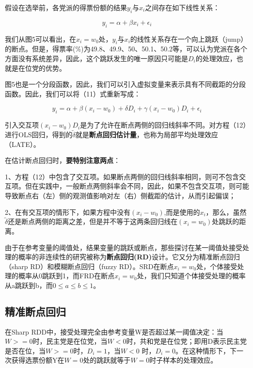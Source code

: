 \documentclass[cn,12pt,math=newtx,citestyle=gb7714-2015,bibstyle=gb7714-2015]{elegantbook}
\begin{document}
	假设在选举前，各党派的得票份额的结果$y_i$与$x_i$之间存在如下线性关系：
	
	\begin{equation}
		y_i=\alpha+\beta{x_i}+\epsilon_i
	\end{equation}
	
	我们从图5可以看出，在$x_i=w_0$处，$y_i$与$x_i$的线性关系存在一个向上跳跃（jump）的断点。但是，得票率(\%)为49.8、49.9、50、50.1、50.2等，可以认为党派在各个方面没有系统差异，因此，这个跳跃发生的唯一原因只可能是$D_i$的处理效应，也就是在位党的优势。
	
	图5也是一个分段函数，因此，我们可以引入虚拟变量来表示具有不同截距的分段函数。因此，我们可以将（11）式重新写成：
	
	\begin{equation}
		y_i=\alpha+\beta{(x_i-w_0)}+\delta{D_i}+\gamma{(x_i-w_0)D_i}+\epsilon_i
	\end{equation}
	
	引入交互项$(x_i-w_0)D_i$是为了允许在断点两侧的回归线斜率不同。对方程（12）进行OLS回归，得到的$\tilde{\delta}$就是\textbf{断点回归估计量}，也称为局部平均处理效应（LATE）。
	
	在估计断点回归时，\textbf{要特别注意两点}：
	
	1、方程（12）中包含了交互项。如果断点两侧的回归线斜率相同，则可不包含交互项。但在实践中，一般断点两侧斜率会不同，因此，如果不包含交互项，则可能导致断点右（左）侧的观测值影响对左（右）侧截距的估计，从而引起偏误；
	
	2、在有交互项的情形下，如果方程中没有$(x_i-w_0)$,而是使用的$x_i$，那么，虽然$\tilde{\delta}$还是断点两侧的距离之差，但是并不等于这两条回归线在$(x_i=w_0)$处跳跃的距离。
	
	由于在参考变量的阈值处，结果变量的跳跃或断点，那些探讨在某一阈值处接受处理的概率的非连续性的研究被称为\textbf{断点回归(RD)}设计。它又分为精准断点回归（sharp RD）和模糊断点回归（fuzzy RD）。SRD在断点$x_i=w_0$处，个体接受处理的概率从0跳跃到1，而FRD在断点$x_i=w_0$处，我们只知道个体接受处理的概率从a跳跃到b，而$0\le{a}\le{b}\le{1}$。
	
	\subsection{精准断点回归}
	
	在Sharp RDD中，接受处理完全由参考变量W是否超过某一阈值决定：当$W>=0$时，民主党是在位党，当$W<0$时，共和党是在位党；即用D表示民主党是否在位，当$W>=0$时，$D_i=1$，当$W<0$ 时，$D_i=0$。在这种情形下，下一次获得选票份额Y在$W=0$处的跳跃就等于$W=0$时子样本的处理效应。
	
\end{document}
